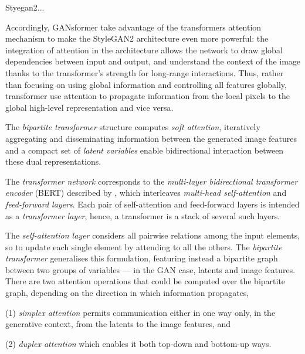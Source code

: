 \documentclass{article}
\begin{document}
	Styegan2...
	
	Accordingly, GANsformer take advantage of the transformers attention mechanism to make the 
	StyleGAN2 architecture even more powerful: the integration of attention in the architecture allows 
	the network to draw global dependencies between input and output, and understand the context of 
	the image thanks to the transformer's strength for long-range interactions.
	Thus, rather than focusing on using global information and controlling all features globally, 
	transformer use attention to propagate information from the local pixels to the global high-level 
	representation and vice versa. 
	
	The \textit{bipartite transformer} structure computes \textit{soft attention}, iteratively aggregating 
	and disseminating information between the generated image features and a compact set of 
	\textit{latent variables} enable bidirectional interaction between these dual representations. 
	
	The \textit{transformer network} corresponds to the \textit{multi-layer bidirectional transformer 
	encoder} (BERT) described by \citet{devlin2019bert}, which interleaves \textit{multi-head 
	self-attention} and \textit{feed-forward layers}.
	Each pair of self-attention and feed-forward layers is intended as a \textit{transformer layer}, hence, 
	a transformer is a stack of several such layers. 
	
	The \textit{self-attention layer} considers all pairwise relations among the input elements, so to 
	update each single element by attending to all the others. 
	The \textit{bipartite transformer} generalises this formulation, featuring instead a bipartite graph 
	between two groups of variables — in the GAN case, latents and image features. 
	There are two attention operations that could be computed over the bipartite graph, depending on 
	the direction in which information propagates, 
	\begin{enumerate*}
		\item [(1)] \textit{simplex attention} permits communication either in one way only, in the 
		generative context, from the latents to the image features, and
		\item [(2)] \textit{duplex attention} which enables it both top-down and bottom-up ways.
	\end{enumerate*}
	
\end{document}
